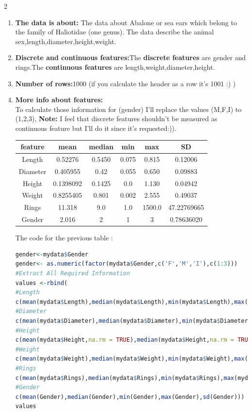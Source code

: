 \documentclass{article}
\begin{document}
\begin{multicols*}{2}
\begin{flushleft}
\begin{enumerate}
 \item \textbf{The data is about:} The data about Abalone or sea ears which belong to the family of Haliotidae (one genus).\cite{1} The data describe the animal sex,length,diameter,height,weight.
 \item \textbf{Discrete and continuous features:}The \textbf{discrete features} are gender and rings.The \textbf{continuous features} are length,weight,diameter,height.
 \item \textbf{Number of rows:}1000 (if you calculate the header as a row it's 1001 :) )
 \item \textbf{More info about features:}\\
 To calculate those information for (gender) I'll replace the values (M,F,I) to (1,2,3), \textbf{Note:} I feel that discrete features shouldn't be measured as continuous feature but I'll do it since it's requested:)).
 \begin{tabular}{|c|c|c|c|c|c|}
\hline
feature&mean&median&min&max&SD\\
\hline
Length&0.52276&0.5450&0.075&0.815&0.12006\\
\hline
Diameter&0.405955&0.42&0.055&0.650&0.09883\\
\hline
Height&0.1398092&0.1425&0.0&1.130&0.04942\\
\hline
Weight&0.8255405&0.801&0.002&2.555&0.49037\\
\hline
Rings&11.318&9.0&1.0&1500.0&47.22769665\\
\hline
Gender&2.016&2&1&3&0.78636020\\
\hline
 \end{tabular}
The code for the previous table  :
\begin{lstlisting}[language=R]
gender<-mydata$Gender
gender<- as.numeric(factor(mydata$Gender,c('F','M','I'),c(1:3)))
#Extract All Required Information
values <-rbind(
#Length
c(mean(mydata$Length),median(mydata$Length),min(mydata$Length),max(mydata$Length),sd(mydata$Length)),
#Diameter
c(mean(mydata$Diameter),median(mydata$Diameter),min(mydata$Diameter),max(mydata$Diameter),sd(mydata$Diameter)),
#Height
c(mean(mydata$Height,na.rm = TRUE),median(mydata$Height,na.rm = TRUE),min(mydata$Height,na.rm = TRUE),max(mydata$Height,na.rm = TRUE),sd(mydata$Height,na.rm = TRUE)),
#Weight
c(mean(mydata$Weight),median(mydata$Weight),min(mydata$Weight),max(mydata$Weight),sd(mydata$Weight)),
#Rings
c(mean(mydata$Rings),median(mydata$Rings),min(mydata$Rings),max(mydata$Rings),sd(mydata$Rings)),
#Gender
c(mean(Gender),median(Gender),min(Gender),max(Gender),sd(Gender)))
values
\end{lstlisting}


\end{enumerate}
\end{flushleft}
\end{multicols*}
\end{document}
